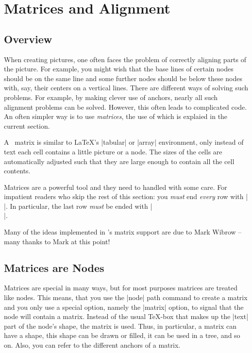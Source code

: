 %
%
%

\section{Matrices and Alignment}

\label{section-matrices}

\subsection{Overview}

When creating pictures, one often faces the problem of correctly
aligning parts of the picture. For example, you might wish that the
base lines of certain nodes should be on the same line and some
further nodes should be below these nodes with, say, their centers on
a vertical lines. There are different ways of solving such
problems. For example, by making clever use of anchors, nearly all
such alignment problems can be solved. However, this often leads to
complicated code. An often simpler way is to use \emph{matrices},
the use of which is explaied in the current section.

A \tikzname\ matrix is similar to \LaTeX's |{tabular}| or
|{array}| environment, only instead of text each cell contains a
little picture or a node. The sizes of the cells are automatically
adjusted such that they are large enough to contain all the cell
contents.

Matrices are a powerful tool and they need to handled with some care.
For impatient readers who skip the rest of this section: you
\emph{must} end \emph{every} row with |\\|. In particular, the last
row \emph{must} be ended with |\\|.

Many of the ideas implemented in \tikzname's matrix support are due to
Mark Wibrow -- many thanks to Mark at this point!



\subsection{Matrices are Nodes}

Matrices are special in many ways, but for most purposes matrices are
treated like nodes. This means, that you use the |node| path command
to create a matrix and you only use a special option, namely the
|matrix| option, to signal that the node will contain a
matrix. Instead of the usual \TeX-box that makes up the |text| part of
the node's shape, the matrix is used. Thus, in particular, a matrix
can have a shape, this shape can be drawn or filled, it can be used in
a tree, and so on. Also, you can refer to the different anchors of a
matrix. 

